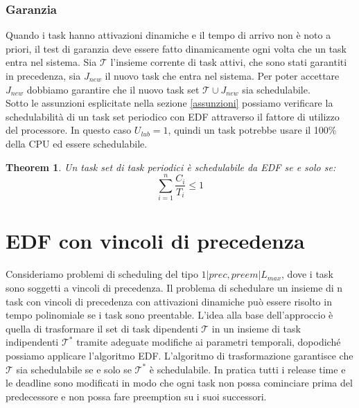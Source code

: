\documentclass[12pt,openany,onesided]{book}
\newtheorem{theorem}{Theorem}
\begin{document}
\subsubsection{Garanzia}
Quando i task hanno attivazioni dinamiche e il tempo di arrivo non è noto a priori, il test di garanzia deve essere fatto dinamicamente ogni volta che un task entra nel sistema.
Sia $\mathcal{T}$ l'insieme corrente di task attivi, che sono stati garantiti in precedenza, sia $J_{new}$ il nuovo task che entra nel sistema.
Per poter accettare $J_{new}$ dobbiamo garantire che il nuovo task set $\mathcal{T} \cup J_{new}$ sia schedulabile.\\
Sotto le assunzioni esplicitate nella sezione \ref{assunzioni} possiamo verificare la schedulabilità di un task set periodico con EDF attraverso il fattore di utilizzo del processore.
In questo caso $U_{lub}=1$, quindi un task potrebbe usare il 100\% della CPU ed essere schedulabile.
\begin{theorem}
    Un task set di task periodici è schedulabile da EDF se e solo se:
    \begin{equation}
        \sum_{i=1}^{n}\frac{C_i}{T_i}\leq 1
    \end{equation}
\end{theorem}
\section{EDF con vincoli di precedenza}
Consideriamo problemi di scheduling del tipo $1|prec,preem|L_{max}$, dove i task sono soggetti a vincoli di precedenza.
Il problema di schedulare un insieme di n task con vincoli di precedenza con attivazioni dinamiche può essere risolto in tempo polinomiale  se i task sono preentable.
L'idea alla base dell'approccio è quella di trasformare  il set di task dipendenti $\mathcal{T}$ in un insieme di task indipendenti $\mathcal{T}^*$ tramite adeguate modifiche ai parametri temporali, dopodiché possiamo applicare l'algoritmo EDF.
L'algoritmo di trasformazione garantisce che $\mathcal{T}$ sia schedulabile se e solo se $\mathcal{T}^*$ è schedulabile. In pratica tutti i release time e le deadline sono modificati in modo che ogni task non possa cominciare prima del predecessore e non possa fare preemption su i suoi successori.
\end{document}
